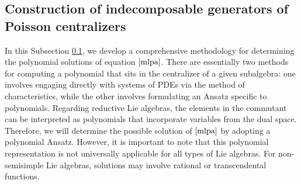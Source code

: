 \documentclass[10pt]{amsart}
\theoremstyle{definition}
\theoremstyle{corollary}
\theoremstyle{remark}
\theoremstyle{conclusion}
\begin{document}
 



 


\subsection{Construction of indecomposable generators of Poisson centralizers}
\label{subsec2.3}

\medskip

 In this Subsection \ref{subsec2.3}, we develop a comprehensive methodology for determining the polynomial solutions of equation $\eqref{mlpa}$. 
 There are essentially two methods for computing a polynomial that sits in the centralizer of a given subalgebra: one involves engaging directly with systems of PDEs via the method of characteristics, while the other involves formulating an Ansatz specific to polynomials. Regarding reductive Lie algebras, the elements in the commutant can be interpreted as polynomials that incorporate variables from the dual space. Therefore, we will determine the possible solution of $\eqref{mlpa}$ by adopting a polynomial Ansatz. However, it is important to note that this polynomial representation is not universally applicable for all types of Lie algebras. For non-semisimple Lie algebras, solutions may involve rational or transcendental functions.
\end{document}
